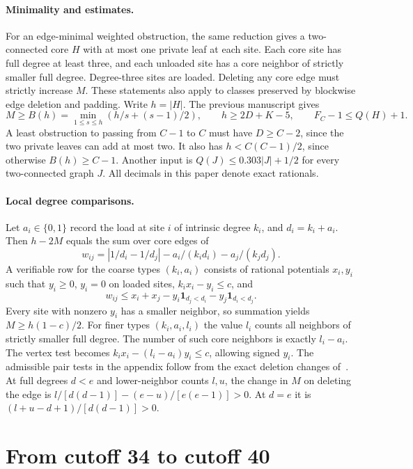 \documentclass[11pt,a4paper]{article}
\begin{document}
\paragraph{Minimality and estimates.}
For an edge-minimal weighted obstruction, the same reduction gives a two-connected core $H$ with at most one private leaf at each site. Each core site has full degree at least three, and each unloaded site has a core neighbor of strictly smaller full degree. Degree-three sites are loaded. Deleting any core edge must strictly increase $M$. These statements also apply to classes preserved by blockwise edge deletion and padding. Write $h=|H|$. The previous manuscript gives
\[
 M\ge B(h)=\min_{1\le s\le h}\left(h/s+(s-1)/2\right),
 \qquad h\ge 2D+K-5,\qquad F_C-1\le Q(H)+1.
\]
A least obstruction to passing from $C-1$ to $C$ must have $D\ge C-2$, since the two private leaves can add at most two. It also has $h<C(C-1)/2$, since otherwise $B(h)\ge C-1$. Another input is $Q(J)\le0.303|J|+1/2$ for every two-connected graph $J$. All decimals in this paper denote exact rationals.
\paragraph{Local degree comparisons.}
Let $a_i\in\{0,1\}$ record the load at site $i$ of intrinsic degree $k_i$, and $d_i=k_i+a_i$. Then $h-2M$ equals the sum over core edges of
\[
 w_{ij}=|1/d_i-1/d_j|-a_i/(k_i d_i)-a_j/(k_j d_j).
\]
A verifiable row for the coarse types $(k_i,a_i)$ consists of rational potentials $x_i,y_i$ such that $y_i\ge0$, $y_i=0$ on loaded sites, $k_i x_i-y_i\le c$, and
\[
 w_{ij}\le x_i+x_j-y_i\mathbf1_{d_j<d_i}-y_j\mathbf1_{d_i<d_j}.
\]
Every site with nonzero $y_i$ has a smaller neighbor, so summation yields $M\ge h(1-c)/2$. For finer types $(k_i,a_i,l_i)$ the value $l_i$ counts all neighbors of strictly smaller full degree. The number of such core neighbors is exactly $l_i-a_i$. The vertex test becomes $k_i x_i-(l_i-a_i)y_i\le c$, allowing signed $y_i$. The admissible pair tests in the appendix follow from the exact deletion changes of~\cite{p14-prior}. At full degrees $d<e$ and lower-neighbor counts $l,u$, the change in $M$ on deleting the edge is $l/[d(d-1)]-(e-u)/[e(e-1)]>0$. At $d=e$ it is $(l+u-d+1)/[d(d-1)]>0$.
\section{From cutoff 34 to cutoff 40}
\end{document}
